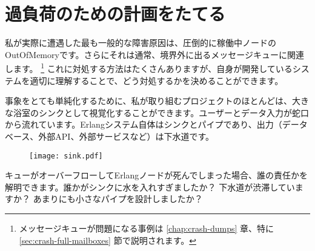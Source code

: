 \chapter{過負荷のための計画をたてる}
\label{chap:overload}

私が実際に遭遇した最も一般的な障害原因は、圧倒的に稼働中ノードのOutOfMemoryです。さらにそれは通常、境界外に出るメッセージキューに関連します。 \footnote{メッセージキューが問題になる事例は \ref{chap:crash-dumps} 章、特に \ref{sec:crash-full-mailboxes} 節で説明されます。} これに対処する方法はたくさんありますが、自身が開発しているシステムを適切に理解することで、どう対処するかを決めることができます。

事象をとても単純化するために、私が取り組むプロジェクトのほとんどは、大きな浴室のシンクとして視覚化することができます。ユーザーとデータ入力が蛇口から流れています。Erlangシステム自体はシンクとパイプであり、出力（データベース、外部API、外部サービスなど）は下水道です。

\begin{figure}[h!]
  \texttt{[image: sink.pdf]}%
  \centering%
   \label{fig:tracing-venn}
\end{figure}

キューがオーバーフローしてErlangノードが死んでしまった場合、誰の責任かを解明できます。誰かがシンクに水を入れすぎましたか？ 下水道が渋滞していますか？ あまりにも小さなパイプを設計しましたか？

